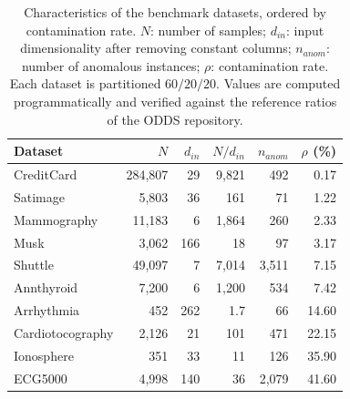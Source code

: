 
\begin{table}[!htbp]
\centering
\caption{Characteristics of the benchmark datasets, ordered by contamination rate. $N$: number of samples; $d_{in}$: input dimensionality after removing constant columns; $n_{anom}$: number of anomalous instances; $\rho$: contamination rate. Each dataset is partitioned $60/20/20$. Values are computed programmatically and verified against the reference ratios of the ODDS repository.}
\label{tab:datasets}
\footnotesize
\setlength{\tabcolsep}{5pt}
\begin{tabular}{lrrrrr}
\toprule
\textbf{Dataset} & \textbf{$N$} & \textbf{$d_{in}$} & \textbf{$N/d_{in}$} & \textbf{$n_{anom}$} & \textbf{$\rho$ (\%)} \\
\midrule
CreditCard & 284{,}807 & 29 & 9{,}821 & 492 & 0.17 \\
Satimage & 5{,}803 & 36 & 161 & 71 & 1.22 \\
Mammography & 11{,}183 & 6 & 1{,}864 & 260 & 2.33 \\
Musk & 3{,}062 & 166 & 18 & 97 & 3.17 \\
Shuttle & 49{,}097 & 7 & 7{,}014 & 3{,}511 & 7.15 \\
Annthyroid & 7{,}200 & 6 & 1{,}200 & 534 & 7.42 \\
Arrhythmia & 452 & 262 & 1.7 & 66 & 14.60 \\
Cardiotocography & 2{,}126 & 21 & 101 & 471 & 22.15 \\
Ionosphere & 351 & 33 & 11 & 126 & 35.90 \\
ECG5000 & 4{,}998 & 140 & 36 & 2{,}079 & 41.60 \\
\bottomrule
\end{tabular}
\end{table}
